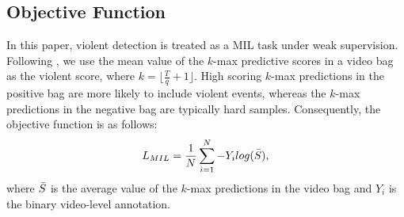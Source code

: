 \documentclass[sigconf]{acmart}
\begin{document}
\subsection{Objective Function}
In this paper, violent detection is treated as a MIL task under weak supervision. Following \cite{c:2,c:7}, we use the mean value of the $k$-max predictive scores in a video bag as the violent score, where $k = \lfloor \frac{T}{q} + 1\rfloor $. High scoring $k$-max predictions in the positive bag are more likely to include violent events, whereas the $k$-max predictions in the negative bag are typically hard samples. Consequently, the objective function is as follows:
\begin{equation}
\small{
L_{MIL} = \frac{1}{N}\sum_{i=1}^{N}{-Y_{i}log(\Bar{S})},
}
\end{equation}
where $\Bar{S}$ is the average value of the $k$-max predictions in the video bag and $Y_i$ is the binary video-level annotation.
\end{document}
